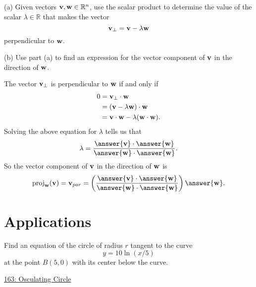 \documentclass{ximera}
\begin{document}
\begin{question}   \label{Qrasd5r:Scalar}
(a) Given vectors ${\bf v}, {\bf w} \in \mathbb{R}^n$, use the scalar product to determine the value of the scalar $\lambda\in \mathbb{R}$ that makes the vector
\[
     {\bf v}_{\perp} = {\bf v} - \lambda {\bf w}
\]
perpendicular to ${\bf w}$.

(b) Use part (a) to find an expression for the vector component of ${\bf v}$ in the direction of ${\bf w}$.

\begin{explanation}
The vector ${\bf v}_{\perp}$ is perpendicular to ${\bf w}$ if and only if
\begin{align*}
     0        &=   \textbf{v}_{\perp} \cdot \textbf{w}   \\ 
               &= \left( {\bf v} - \lambda {\bf w} \right) \cdot {\bf w} \\
               &= {\bf v}\cdot {\bf w} - \lambda ({\bf w}\cdot {\bf w}) .
\end{align*}
Solving the above equation for $\lambda$ tells us that
\[
    \lambda = \frac{\answer{{\bf v}}\cdot \answer{{\bf w}}}{\answer{{\bf w}}\cdot \answer{{\bf w}}} .
\]
So the vector component of ${\bf v}$ in the direction of ${\bf w}$ is
\[
    \text{proj}_{{\bf w}}({\bf v}) = {\bf v}_{par} = \left(  \frac{\answer{{\bf v}}\cdot \answer{{\bf w}}}{\answer{{\bf w}}\cdot \answer{{\bf w}}}    \right) \answer{\bf w}.
\]
\end{explanation}
\end{question}


\section{Applications}

\begin{question} \label{Q98734454331}
Find an equation of the circle of radius $r$ tangent to the curve
\[
    y=10\ln (x/5)
\]
at the point $B(5,0)$ with its center below the curve.

 
\begin{onlineOnly}
    \begin{center}
\end{center}
\end{onlineOnly}
 
\href{https://www.geogebra.org/classic/fgvvdjaf}{163: Osculating Circle}
 
\end{question}
\end{document}
